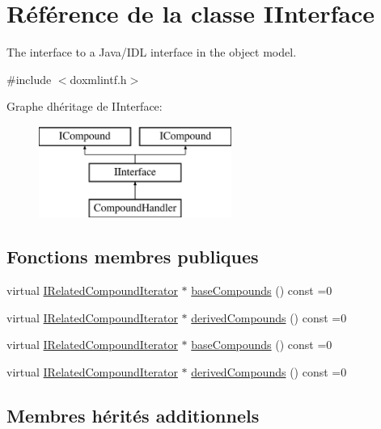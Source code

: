 \hypertarget{class_i_interface}{}\section{Référence de la classe I\+Interface}
\label{class_i_interface}


The interface to a Java/\+I\+D\+L interface in the object model.  




{\ttfamily \#include $<$doxmlintf.\+h$>$}

Graphe d\textquotesingle{}héritage de I\+Interface\+:\begin{figure}[H]
\begin{center}
\leavevmode
\includegraphics[height=3.000000cm]{class_i_interface}
\end{center}
\end{figure}
\subsection*{Fonctions membres publiques}
\begin{DoxyCompactItemize}
\item 
virtual \hyperlink{class_i_related_compound_iterator}{I\+Related\+Compound\+Iterator} $\ast$ \hyperlink{class_i_interface_a74c706d436b8f7f1d7d729d9cb181787}{base\+Compounds} () const  =0
\item 
virtual \hyperlink{class_i_related_compound_iterator}{I\+Related\+Compound\+Iterator} $\ast$ \hyperlink{class_i_interface_a78ed653abee8d0660e93131dd03b7771}{derived\+Compounds} () const  =0
\item 
virtual \hyperlink{class_i_related_compound_iterator}{I\+Related\+Compound\+Iterator} $\ast$ \hyperlink{class_i_interface_a74c706d436b8f7f1d7d729d9cb181787}{base\+Compounds} () const  =0
\item 
virtual \hyperlink{class_i_related_compound_iterator}{I\+Related\+Compound\+Iterator} $\ast$ \hyperlink{class_i_interface_a78ed653abee8d0660e93131dd03b7771}{derived\+Compounds} () const  =0
\end{DoxyCompactItemize}
\subsection*{Membres hérités additionnels}


